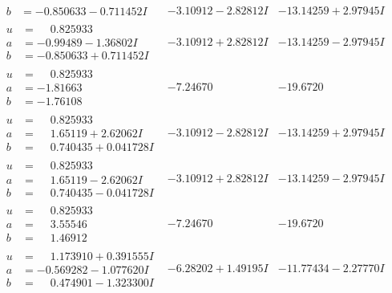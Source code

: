 \documentclass[1p]{elsarticle_modified}
\theoremstyle{definition}
\begin{document}
$$\begin{array}{c|c|c}
\begin{aligned}
b &= -0.850633 - 0.711452 I\end{aligned}
 & -3.10912 - 2.82812 I & -13.14259 + 2.97945 I \\ \hline\begin{aligned}
u &= \phantom{-}0.825933\phantom{ +0.000000I} \\
a &= -0.99489 - 1.36802 I \\
b &= -0.850633 + 0.711452 I\end{aligned}
 & -3.10912 + 2.82812 I & -13.14259 - 2.97945 I \\ \hline\begin{aligned}
u &= \phantom{-}0.825933\phantom{ +0.000000I} \\
a &= -1.81663\phantom{ +0.000000I} \\
b &= -1.76108\phantom{ +0.000000I}\end{aligned}
 & -7.24670\phantom{ +0.000000I} & -19.6720\phantom{ +0.000000I} \\ \hline\begin{aligned}
u &= \phantom{-}0.825933\phantom{ +0.000000I} \\
a &= \phantom{-}1.65119 + 2.62062 I \\
b &= \phantom{-}0.740435 + 0.041728 I\end{aligned}
 & -3.10912 - 2.82812 I & -13.14259 + 2.97945 I \\ \hline\begin{aligned}
u &= \phantom{-}0.825933\phantom{ +0.000000I} \\
a &= \phantom{-}1.65119 - 2.62062 I \\
b &= \phantom{-}0.740435 - 0.041728 I\end{aligned}
 & -3.10912 + 2.82812 I & -13.14259 - 2.97945 I \\ \hline\begin{aligned}
u &= \phantom{-}0.825933\phantom{ +0.000000I} \\
a &= \phantom{-}3.55546\phantom{ +0.000000I} \\
b &= \phantom{-}1.46912\phantom{ +0.000000I}\end{aligned}
 & -7.24670\phantom{ +0.000000I} & -19.6720\phantom{ +0.000000I} \\ \hline\begin{aligned}
u &= \phantom{-}1.173910 + 0.391555 I \\
a &= -0.569282 - 1.077620 I \\
b &= \phantom{-}0.474901 - 1.323300 I\end{aligned}
 & -6.28202 + 1.49195 I & -11.77434 - 2.27770 I \\ \hline\begin{aligned}

\end{aligned}
\end{array}$$
\end{document}
